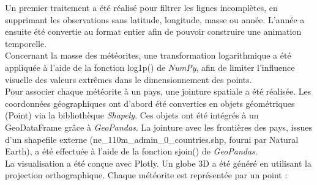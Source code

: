 \documentclass[12pt]{article}
\begin{document}
Un premier traitement a été réalisé pour filtrer les lignes incomplètes, en supprimant les
observations sans latitude, longitude, masse ou année. L’année a ensuite été convertie au
format entier afin de pouvoir construire une animation temporelle.
\\

Concernant la masse des météorites, une transformation logarithmique a été appliquée à l’aide de la fonction log1p() de \textit{NumPy}, afin de limiter l’influence visuelle des valeurs extrêmes dans le dimensionnement des points.
\\

Pour associer chaque météorite à un pays, une jointure spatiale a été réalisée. Les coordonnées géographiques ont d’abord été converties en objets géométriques (Point) via la bibliothèque \textit{Shapely}. Ces objets ont été intégrés à un GeoDataFrame grâce à \textit{GeoPandas}. La jointure avec les frontières des pays, issues d’un shapefile externe (ne\_110m\_admin\_0\_countries.shp, fourni
par Natural Earth), a été effectuée à l’aide de la fonction sjoin() de \textit{GeoPandas}.
\\


La visualisation a été conçue avec Plotly. Un globe 3D a été généré en utilisant la projection orthographique. Chaque météorite est représentée par un point :
\end{document}
